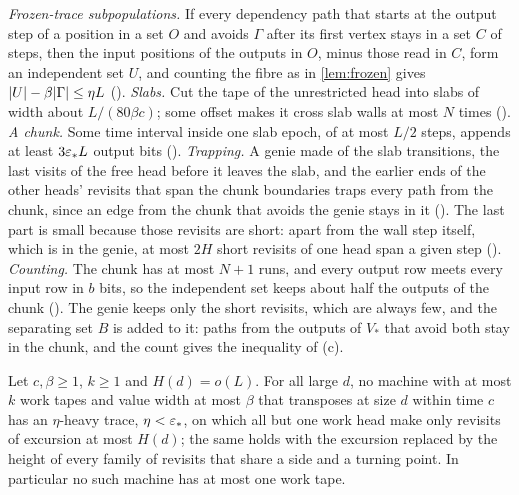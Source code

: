 \begin{outline}
\emph{Frozen-trace subpopulations.} If every dependency path that starts at the output step of a position in a set $O$ and avoids
$\Gamma$ after its first vertex stays in a set $C$ of steps, then the input positions of the outputs in $O$, minus those read in $C$,
form an independent set $U$, and counting the fibre as in \cref{lem:frozen} gives $\lvert U \rvert-\beta\lvert \Gamma \rvert\le\eta L$
().
\emph{Slabs.} Cut the tape of the unrestricted head into slabs of width about $L/(80\beta c)$; some offset makes it cross slab walls at
most $N$ times (). \emph{A chunk.} Some time interval inside one slab epoch, of at most $L/2$
steps, appends at least $3\varepsilon_*L$ output bits (). \emph{Trapping.} A genie made of the slab
transitions, the last visits of the free head before it leaves the slab, and the earlier ends of the other heads' revisits that span
the chunk boundaries traps every path from the chunk, since an edge from the chunk that avoids the genie stays in it
(). The last part is small because those revisits are short: apart from the wall step itself, which
is in the genie, at most $2H$ short revisits of one head span a given step ().
\emph{Counting.} The chunk has at most $N+1$ runs, and every output row meets every input row in $b$ bits, so the independent set
keeps about half the outputs of the chunk (). The genie keeps only the short revisits,
which are always few, and the separating set $B$ is added to it: paths from the outputs of $V_*$ that avoid both stay in the chunk, and
the count gives the inequality of (c).
\end{outline}

\begin{corollary}\label{cor:H}
Let $c,\beta\ge1$, $k\ge1$ and $H(d)=o(L)$. For all large $d$, no machine with at most $k$ work tapes and value width at most $\beta$
that transposes at size $d$ within time $c$ has an $\eta$-heavy trace, $\eta<\varepsilon_*$, on which all but one work head make only revisits
of excursion at most $H(d)$; the same holds with the excursion replaced by the height of every family of revisits that share a side
and a turning point. In particular no such machine has at most one work tape.
\end{corollary}

